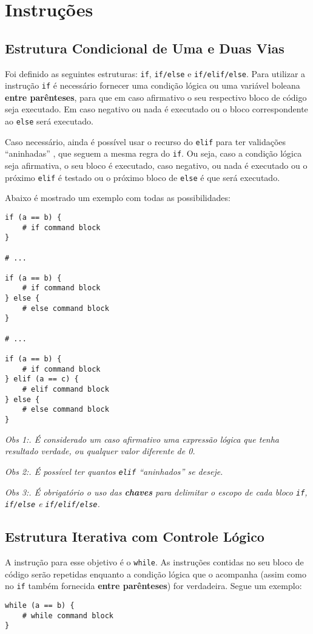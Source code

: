 \documentclass[a4paper,11pt]{article}
\begin{document}
\section{Instruções}
\subsection{Estrutura Condicional de Uma e Duas Vias}
Foi definido as seguintes estruturas: \texttt{if}, \texttt{if/else} e \texttt{if/elif/else}.
Para utilizar a instrução \texttt{if} é necessário fornecer uma condição lógica ou uma variável
boleana \textbf{entre parênteses}, para que em caso afirmativo o seu respectivo bloco de código
seja executado. Em caso negativo ou nada é executado ou o bloco correspondente ao \texttt{else}
será executado.

Caso necessário, ainda é possível usar o recurso do \texttt{elif} para ter validações ``aninhadas''
, que seguem a mesma regra do \texttt{if}. Ou seja, caso a condição lógica seja afirmativa, o seu
bloco é executado, caso negativo, ou nada é executado ou o próximo \texttt{elif} é testado ou
o próximo bloco de \texttt{else} é que será executado.

Abaixo é mostrado um exemplo com todas as possibilidades:
\begin{lstlisting}
if (a == b) {
    # if command block
}

# ...

if (a == b) {
    # if command block
} else {
    # else command block
}

# ...

if (a == b) {
    # if command block
} elif (a == c) {
    # elif command block
} else {
    # else command block
}
\end{lstlisting}

\textit{Obs 1:. É considerado um caso afirmativo uma expressão lógica que tenha resultado verdade,
ou qualquer valor diferente de 0.}

\textit{Obs 2:. É possível ter quantos \texttt{elif} ``aninhados'' se deseje.}

\textit{Obs 3:. É obrigatório o uso das \textbf{chaves} para delimitar o escopo de cada bloco
\texttt{if}, \texttt{if/else} e \texttt{if/elif/else}.}

\subsection{Estrutura Iterativa com Controle Lógico}
A instrução para esse objetivo é o \texttt{while}. As instruções contidas no seu bloco de código
serão repetidas enquanto a condição lógica que o acompanha (assim como no \texttt{if} também
fornecida \textbf{entre parênteses}) for verdadeira. Segue um exemplo:
\begin{lstlisting}
while (a == b) {
    # while command block
}
\end{lstlisting}
\end{document}
